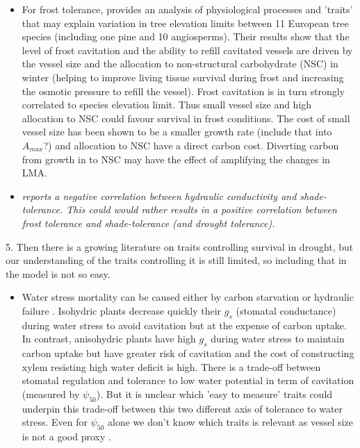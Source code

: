 \documentclass[a4paper,11pt]{article}
\begin{document}
\begin{itemize}
\item  For frost tolerance, \citet{Charrier-2013} provides an analysis of physiological processes and 'traits' that may explain variation in tree elevation limits between 11 European tree species (including one pine and 10 angiosperms). Their results show that the level of frost cavitation and the ability to refill cavitated vessels are driven by the vessel size and the allocation to non-structural carbohydrate (NSC) in winter (helping to improve living tissue survival during frost and increasing the osmotic pressure to refill the vessel). Frost cavitation is in turn strongly correlated to species elevation limit. Thus small vessel size and high allocation to NSC could favour survival in frost conditions. The cost of small vessel size has been shown to be a smaller growth rate \citep{Poorter-2010} (include that into $A_{max}$?) and allocation to NSC have a direct carbon cost. Diverting carbon from growth in to NSC may have the effect of amplifying the changes in LMA.
\item \textit{\citet{Markesteijn-2011} reports a negative correlation between hydraulic conductivity and shade-tolerance. This could would rather results in a positive correlation between frost tolerance and shade-tolerance (and drought tolerance).}
\end{itemize}

5. Then there is a growing literature on traits controlling survival in drought, but our understanding of the traits controlling it is still limited, so including that in the model is not so easy.

\begin{itemize}
\item Water stress mortality can be caused either by carbon starvation or hydraulic failure \citep{McDowell-2008,McDowell-2011,Skelton-2015}. Isohydric plants decrease quickly their $g_s$ (stomatal conductance) during water stress to avoid cavitation but at the expense of carbon uptake. In contrast, anisohydric plants have high $g_s$ during water stress to maintain carbon uptake but have greater risk of cavitation and the cost of constructing xylem resisting high water deficit is high. There is a trade-off between stomatal regulation and tolerance to low water potential in term of cavitation (measured by $\psi_{50}$). But it is unclear which 'easy to measure' traits could underpin this trade-off between this two different axis of tolerance to water stress. Even for $\psi_{50}$ alone we don't know which traits is relevant as vessel size is not a good proxy \citep{Maherali-2004}.
\end{itemize}




\clearpage




\end{document}

